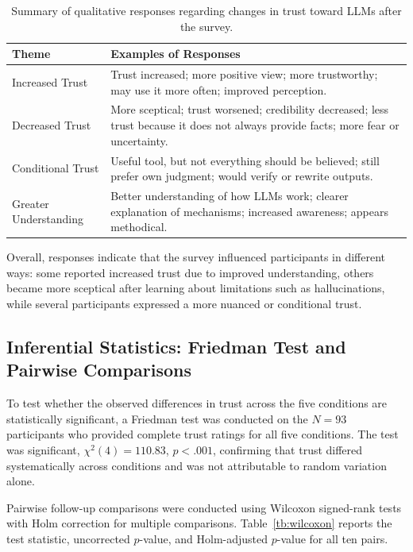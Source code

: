 \begin{table}[h!]
\centering
\small
\begin{tabular}{p{3.2cm} p{11cm}}
\hline
\textbf{Theme} & \textbf{Examples of Responses} \\
\hline

Increased Trust &
Trust increased; more positive view; more trustworthy; may use it more often; improved perception. \\

Decreased Trust &
More sceptical; trust worsened; credibility decreased; less trust because it does not always provide facts; more fear or uncertainty. \\

Conditional Trust &
Useful tool, but not everything should be believed; still prefer own judgment; would verify or rewrite outputs. \\

Greater Understanding &
Better understanding of how LLMs work; clearer explanation of mechanisms; increased awareness; appears methodical. \\

\hline
\end{tabular}
\caption{Summary of qualitative responses regarding changes in trust toward LLMs after the survey.}
\label{tb:example_responses_trust}
\end{table}

Overall, responses indicate that the survey influenced participants in different ways: some reported increased trust due to improved understanding, others became more sceptical after learning about limitations such as hallucinations, while several participants expressed a more nuanced or conditional trust.

\subsection{Inferential Statistics: Friedman Test and Pairwise Comparisons}
\label{sec:inferential}
 
To test whether the observed differences in trust across the five conditions are statistically
significant, a Friedman test was conducted on the $N = 93$ participants who provided complete
trust ratings for all five conditions. The test was significant,
$\chi^2(4) = 110.83$, $p < .001$, confirming that trust differed systematically across
conditions and was not attributable to random variation alone.
 
Pairwise follow-up comparisons were conducted using Wilcoxon signed-rank tests with
Holm correction for multiple comparisons. Table~\ref{tb:wilcoxon} reports the test statistic,
uncorrected $p$-value, and Holm-adjusted $p$-value for all ten pairs.
 
